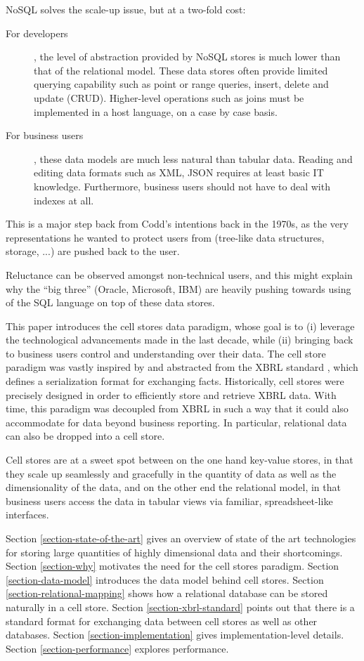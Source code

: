 \documentclass{vldb}
\begin{document}
NoSQL solves the scale-up issue, but at a two-fold cost:
\begin{description}
\item[For developers], the level of abstraction provided by NoSQL stores is much lower than that of the relational model. These data stores often provide limited querying capability such as point or range queries, insert, delete and update (CRUD). Higher-level operations such as joins must be implemented in a host language, on a case by case basis.
\item[For business users], these data models are much less natural than tabular data. Reading and editing data formats such as XML, JSON requires at least basic IT knowledge. Furthermore, business users should not have to deal with indexes at all.
\end{description}

This is a major step back from Codd's intentions back in the 1970s, as the very representations he wanted to protect users from (tree-like data structures, storage, ...) are pushed back to the user.

Reluctance can be observed amongst non-technical users, and this might explain why the ``big three'' (Oracle, Microsoft, IBM) are heavily pushing towards using of the SQL language \cite{Chamberlin1974} on top of these data stores.

This paper introduces the cell stores data paradigm, whose goal is to (i) leverage the technological advancements made in the last decade, while (ii) bringing back to business users control and understanding over their data. The cell store paradigm was vastly inspired by and abstracted from the XBRL standard \cite{XBRL}, which defines a serialization format for exchanging facts. Historically, cell stores were precisely designed in order to efficiently store and retrieve XBRL data. With time, this paradigm was decoupled from XBRL in such a way that it could also accommodate for data beyond business reporting. In particular, relational data can also be dropped into a cell store.

Cell stores are at a sweet spot between on the one hand key-value stores, in that they scale up seamlessly and gracefully in the quantity of data as well as the dimensionality of the data, and on the other end the relational model, in that business users access the data in tabular views via familiar, spreadsheet-like interfaces.

Section \ref{section-state-of-the-art} gives an overview of state of the art technologies for storing large quantities of highly dimensional data and their shortcomings. Section \ref{section-why} motivates the need for the cell stores paradigm. Section \ref{section-data-model} introduces the data model behind cell stores. Section \ref{section-relational-mapping} shows how a relational database can be stored naturally in a cell store. Section \ref{section-xbrl-standard} points out that there is a standard format for exchanging data between cell stores as well as other databases. Section \ref{section-implementation} gives implementation-level details. Section \ref{section-performance} explores performance.
\end{document}
